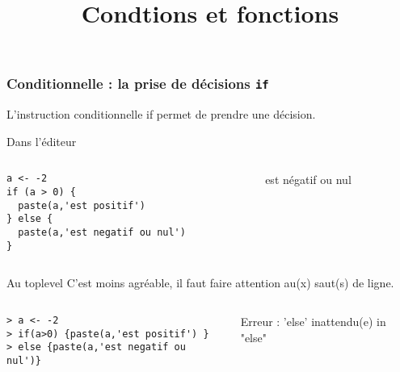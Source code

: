 \documentclass[10pt]{beamer}
\title{Condtions et fonctions}
\begin{document}
\maketitle


\begin{frame}[fragile]
  \frametitle{Conditionnelle : la prise de décisions \texttt{if}}
  \alert{L'instruction conditionnelle if permet de prendre une décision.}

  \begin{block}{Dans l'éditeur}
    \begin{columns}[c]
      \begin{column}{0.53\textwidth}
  \begin{lstlisting}[style=editor]
a <- -2
if (a > 0) {
  paste(a,'est positif')
} else {
  paste(a,'est negatif ou nul')
}    
\end{lstlisting}

\end{column}
\begin{column}{0.47\textwidth}
   est négatif ou nul
\end{column}
\end{columns} 
  \end{block}
  


\begin{block}{Au toplevel}
  C'est moins agréable, il faut faire attention au(x) saut(s) de ligne.
\end{block}
\begin{columns}[c]
\begin{column}{0.65\textwidth}
  \begin{lstlisting}
> a <- -2
> if(a>0) {paste(a,'est positif') }
> else {paste(a,'est negatif ou nul')}
  \end{lstlisting}
\end{column}
\begin{column}{0.35\textwidth}
  \RUN 
  \alert{Erreur : 'else' inattendu(e) in "else"}
\end{column}
\end{columns}
\end{frame}
\end{document}
